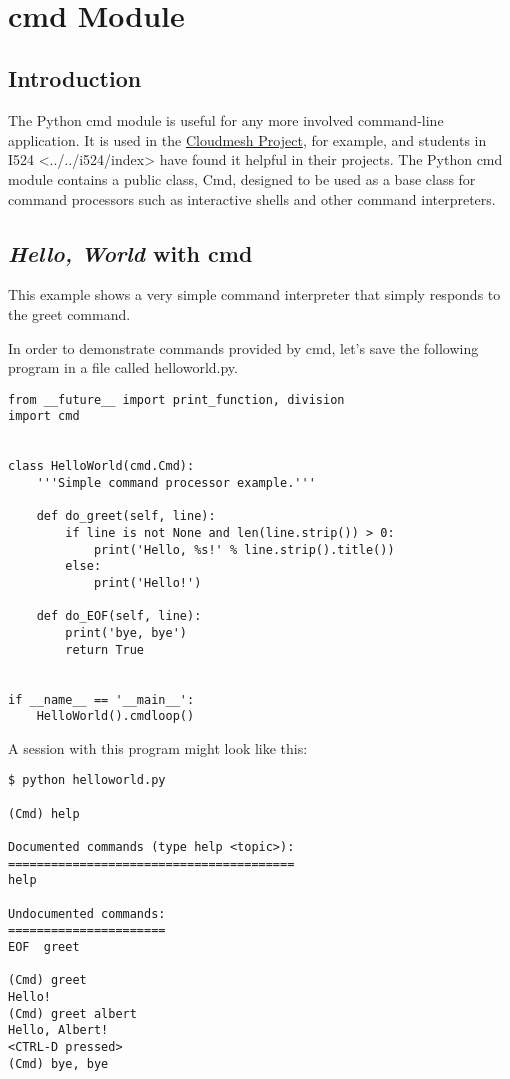 \FILENAME\
\section{cmd Module}\label{cmd-module}

\subsection{Introduction}\label{introduction}

The Python cmd module is useful for any more involved command-line
application. It is used in the
\href{http://cloudmesh.github.io/}{Cloudmesh Project}, for example, and
students in I524
\textless{}../../i524/index\textgreater{} have found it helpful in their
projects. The Python cmd module contains a public class, Cmd, designed
to be used as a base class for command processors such as interactive
shells and other command interpreters.

\subsection{\texorpdfstring{\emph{Hello, World} with
cmd}{Hello, World with cmd}}\label{hello-world-with-cmd}

This example shows a very simple command interpreter that simply
responds to the greet command.

In order to demonstrate commands provided by cmd, let's save the
following program in a file called helloworld.py.

\begin{lstlisting}
from __future__ import print_function, division
import cmd


class HelloWorld(cmd.Cmd):
    '''Simple command processor example.'''

    def do_greet(self, line):
        if line is not None and len(line.strip()) > 0:
            print('Hello, %s!' % line.strip().title())
        else:
            print('Hello!')

    def do_EOF(self, line):
        print('bye, bye')
        return True


if __name__ == '__main__':
    HelloWorld().cmdloop()
\end{lstlisting}

A session with this program might look like this:

\begin{lstlisting}
$ python helloworld.py

(Cmd) help

Documented commands (type help <topic>):
========================================
help

Undocumented commands:
======================
EOF  greet

(Cmd) greet
Hello!
(Cmd) greet albert
Hello, Albert!
<CTRL-D pressed>
(Cmd) bye, bye
\end{lstlisting}


